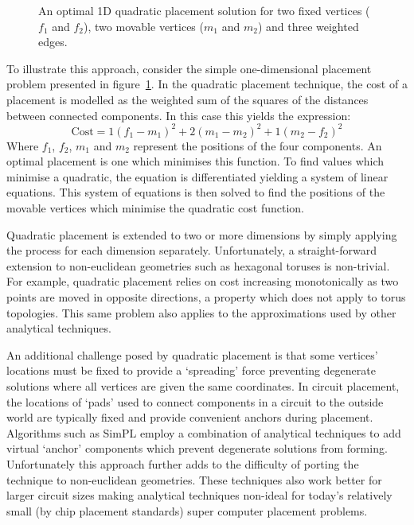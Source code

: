 				\begin{figure}
					\center
					
					\caption[An optimal 1D quadratic placement solution.]%
					{An optimal 1D quadratic placement solution for two fixed
					vertices ($f_1$ and $f_2$), two movable vertices ($m_1$ and $m_2$)
					and three weighted edges.}
					\label{fig:quadratic-placement}
				\end{figure}
				
				To illustrate this approach, consider the simple one-dimensional
				placement problem presented in figure~\ref{fig:quadratic-placement}.
				In the quadratic placement technique, the cost of a placement is
				modelled as the weighted sum of the squares of the distances between
				connected components. In this case this yields the expression:
				\begin{equation*}
					\textrm{Cost} = 1(f_1 - m_1)^2 + 2(m_1 - m_2)^2 + 1(m_2 - f_2)^2
				\end{equation*}
				Where $f_1$, $f_2$, $m_1$ and $m_2$ represent the positions of the four
				components. An optimal placement is one which minimises this function.
				To find values which minimise a quadratic, the equation is
				differentiated yielding a system of linear equations. This system of
				equations is then solved to find the positions of the movable vertices
				which minimise the quadratic cost function.
				
				Quadratic placement is extended to two or more dimensions by simply
				applying the process for each dimension separately. Unfortunately, a
				straight-forward extension to non-euclidean geometries such as
				hexagonal toruses is non-trivial. For example, quadratic placement
				relies on cost increasing monotonically as two points are moved in
				opposite directions, a property which does not apply to torus
				topologies. This same problem also applies to the approximations used
				by other analytical techniques.
				
				An additional challenge posed by quadratic placement is that some
				vertices' locations must be fixed to provide a `spreading'
				force preventing degenerate solutions where all vertices are given the
				same coordinates. In circuit placement, the locations of `pads' used to
				connect components in a circuit to the outside world are typically
				fixed and provide convenient anchors during placement. Algorithms such
				as SimPL \cite{kim12b} employ a combination of analytical techniques
				to add virtual `anchor' components which prevent degenerate
				solutions from forming. Unfortunately this approach further adds to the
				difficulty of porting the technique to non-euclidean geometries. These
				techniques also work better for larger circuit sizes making analytical
				techniques non-ideal for today's relatively small (by chip placement
				standards) super computer placement problems.
				
